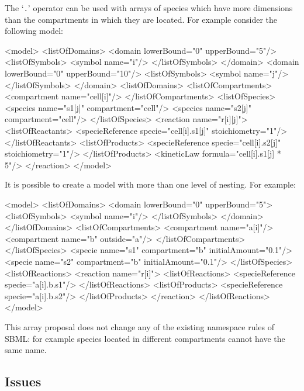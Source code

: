 \documentclass{cekarticle}
\begin{document}
The `\texttt{.}' operator can be used with arrays of species which
have more dimensions than the compartments in which they are
located. For example consider the following model:
\begin{example}
<model>
    <listOfDomains>
        <domain lowerBound="0" upperBound="5"/>
            <listOfSymbols>
                <symbol name="i"/>
            </listOfSymbols>
        </domain>
        <domain lowerBound="0" upperBound="10"/>
            <listOfSymbols>
                <symbol name="j"/>
            </listOfSymbols>
        </domain>
    <listOfDomains>
    <listOfCompartments>
        <compartment name="cell[i]"/>
    </listOfCompartments>
    <listOfSpecies>
        <species name="s1[j]" compartment="cell"/>
        <species name="s2[j]" compartment="cell"/>
    </listOfSpecies>
    <reaction name="r[i][j]">
        <listOfReactants>
            <specieReference specie="cell[i].s1[j]" stoichiometry="1"/>
        </listOfReactants>
        <listOfProducts>
            <specieReference specie="cell[i].s2[j]" stoichiometry="1"/>
        </listOfProducts>
        <kineticLaw formula="cell[i].s1[j] * 5"/>
    </reaction>
</model>
\end{example}

It is possible to create a model with more than one level of nesting.
For example:

\begin{example}
<model>
    <listOfDomains>
        <domain lowerBound="0" upperBound="5">
            <listOfSymbols>
                <symbol name="i"/>
            </listOfSymbols>
        </domain>
    </listOfDomains>
    <listOfCompartments>
        <compartment name="a[i]"/>
        <compartment name="b" outside="a"/>
    </listOfCompartments>
    </listOfSpecies>
        <specie name="s1" compartment="b" initialAmount="0.1"/>
        <specie name="s2" compartment="b" initialAmount="0.1"/>
    </listOfSpecies>
    <listOfReactions>
        <reaction name="r[i]">
            <listOfReactions>
                <specieReference specie="a[i].b.s1"/>
            </listOfReactions>
            <listOfProducts>
                <specieReference specie="a[i].b.s2"/>
            </listOfProducts>
        </reaction>
    </listOfReactions>
</model>
\end{example}
This array proposal does not change any of the existing namespace
rules of SBML: for example species located in different compartments cannot
have the same name.

\subsection{Issues}
\end{document}
